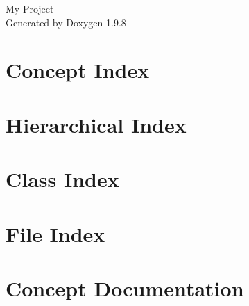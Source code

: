 \documentclass[twoside]{book}
\newcommand{\+}{\discretionary{\mbox{\scriptsize$\hookleftarrow$}}{}{}}
\newcommand{\clearemptydoublepage}{%
    \newpage{\pagestyle{empty}\cleardoublepage}%
  }
\begin{document}
  \raggedbottom
    \hypersetup{pageanchor=false,
                bookmarksnumbered=true,
                pdfencoding=unicode
               }
  \begin{titlepage}
  \vspace*{7cm}
  \begin{center}%
  {\Large My Project}\\
  \vspace*{1cm}
  {\large Generated by Doxygen 1.9.8}\\
  \end{center}
  \end{titlepage}
  \clearemptydoublepage
  \tableofcontents
  \clearemptydoublepage
  \hypersetup{pageanchor=true}
\chapter{Concept Index}

\chapter{Hierarchical Index}

\chapter{Class Index}

\chapter{File Index}

\chapter{Concept Documentation}














\end{document}
